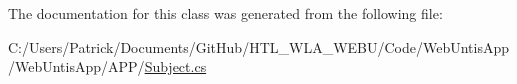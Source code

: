 The documentation for this class was generated from the following file\-:\begin{DoxyCompactItemize}
\item 
C\-:/\-Users/\-Patrick/\-Documents/\-Git\-Hub/\-H\-T\-L\-\_\-\-W\-L\-A\-\_\-\-W\-E\-B\-U/\-Code/\-Web\-Untis\-App/\-Web\-Untis\-App/\-A\-P\-P/\hyperlink{_subject_8cs}{Subject.\-cs}\end{DoxyCompactItemize}
